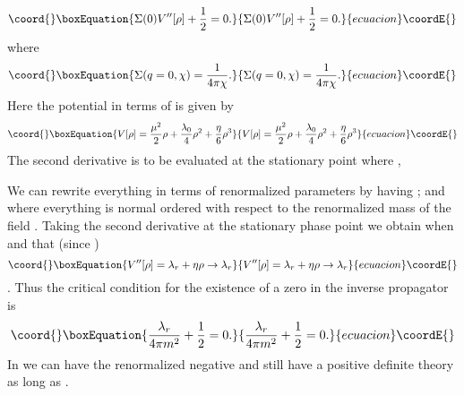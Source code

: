 \documentclass[a4paper,prd,preprint,superscriptaddress,showpacs,byrevtex]{revtex4}
\begin{document}
\begin{equation}\coord{}\boxEquation{
\Sigma(0) V^{\prime \prime} [\rho] + \frac{1}{2} = 0.
}{
\Sigma(0) V^{\prime \prime} [\rho] + \frac{1}{2} = 0.
}{ecuacion}\coordE{}\end{equation}
where
\begin{equation}\coord{}\boxEquation{
\Sigma(q=0,\chi) = \frac{1}{4 \pi \chi}.
}{
\Sigma(q=0,\chi) = \frac{1}{4 \pi \chi}.
}{ecuacion}\coordE{}\end{equation}
Here the potential in terms of \myHighlight{$\rho$}\coordHE{} is given by
\begin{equation}\coord{}\boxEquation{
V[\rho] = \frac {\mu^2}{2} \rho + \frac{\lambda_0} {4} \rho^2 + \frac{\eta}{6} \rho^3
}{
V[\rho] = \frac {\mu^2}{2} \rho + \frac{\lambda_0} {4} \rho^2 + \frac{\eta}{6} \rho^3
}{ecuacion}\coordE{}\end{equation}
The second derivative is to be evaluated at the stationary point where
\coordHE{}, \coordHE{}

We can rewrite everything in terms of renormalized parameters by having 
\coordHE{}; \coordHE{} and \coordHE{}
where everything is normal ordered with respect to the renormalized mass of the 
\myHighlight{$\phi$}\coordHE{} field \coordHE{}. 
Taking the second derivative at the stationary phase point we obtain when \coordHE{}  and \coordHE{} that (since \coordHE{})
\begin{equation}\coord{}\boxEquation{
V''[\rho] = \lambda_r + \eta \rho \rightarrow \lambda_r
}{
V''[\rho] = \lambda_r + \eta \rho \rightarrow \lambda_r
}{ecuacion}\coordE{}\end{equation}
. Thus the critical condition for the existence of a zero in the 
inverse propagator is
\begin{equation}\coord{}\boxEquation{
\frac{\lambda_r}{4 \pi m^2} +\frac{1}{2} =0.
}{
\frac{\lambda_r}{4 \pi m^2} +\frac{1}{2} =0.
}{ecuacion}\coordE{}\end{equation}
In \coordHE{} we can have the renormalized \coordHE{} negative and still have a positive
definite theory as long as \coordHE{}.
\end{document}
